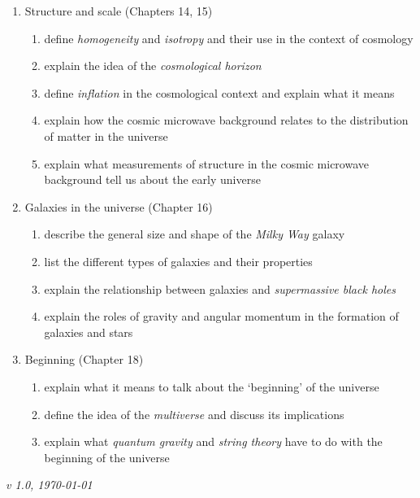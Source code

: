 \documentclass[11pt]{article}
\begin{document}
\begin{enumerate}
\item Structure and scale (Chapters 14, 15)
\begin{enumerate}
\item define {\em homogeneity} and {\em isotropy} and their use in the context of cosmology
\item explain the idea of the {\em cosmological horizon}
\item define {\em inflation} in the cosmological context and explain what it means
\item explain how the cosmic microwave background relates to the distribution
of matter in the universe
\item explain what measurements of structure in the cosmic microwave background
tell us about the early universe
\end{enumerate}


\item Galaxies in the universe (Chapter 16)
\begin{enumerate}
\item describe the general size and shape of the {\em Milky Way} galaxy
\item list the different types of galaxies and their properties
\item explain the relationship between galaxies and {\em supermassive black holes}
\item explain the roles of gravity and angular momentum in the formation of galaxies and stars
\end{enumerate}

\item Beginning (Chapter 18)
\begin{enumerate}
\item explain what it means to talk about the `beginning' of the universe
\item define the idea of the {\em multiverse} and discuss its implications
\item explain what {\em quantum gravity} and {\em  string theory} have to do with the beginning of
the universe
\end{enumerate}

\end{enumerate}

\vspace{1cm}
\it{v 1.0, \today}
\end{document}
